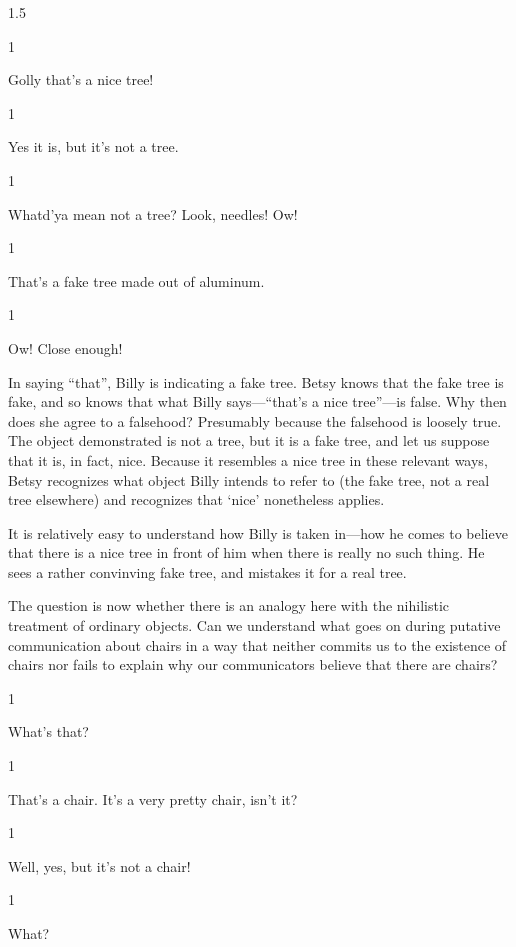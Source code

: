\documentclass[11pt]{standalone} \newif\ifstandlone \standalonetrue
\newcommand{\stage}[3]%
{%
	\begin{spacing}{1}%
	\vspace{0pt}
		\begin{description}[style=nextline, parsep=0pt,
                    leftmargin=15mm, itemindent=-10mm, font=\mdseries]
			\item[\textsc{#1} \emph{#2}] #3
		\end{description}%
	\end{spacing}%
}
\begin{document}
\begin{spacing}{1.5}
\stage{Billy}{(pointing)}{Golly that's a nice tree!}

\stage{Betsy}{}{Yes it is, but it's not a tree.}

\stage{Billy}{}{Whatd'ya mean not a tree?  Look, needles!  Ow!}

\stage{Betsy}{}{That's a fake tree made out of aluminum.}

\stage{Billy}{}{Ow!  Close enough!}

In saying ``that'', Billy is indicating a fake tree.  Betsy knows that
the fake tree is fake, and so knows that what Billy says---``that's a
nice tree''---is false.  Why then does she agree to a falsehood?
Presumably because the falsehood is loosely true.  The object
demonstrated is not a tree, but it is a fake tree, and let us suppose
that it is, in fact, nice.  Because it resembles a nice tree in these
relevant ways, Betsy recognizes what object Billy intends to refer to
(the fake tree, not a real tree elsewhere) and recognizes that
`nice' nonetheless applies.

It is relatively easy to understand how Billy is taken in---how he
comes to believe that there is a nice tree in front of him when there
is really no such thing.  He sees a rather convinving fake tree, and
mistakes it for a real tree.

The question is now whether there is an analogy here with the
nihilistic treatment of ordinary objects.  Can we understand what goes
on during putative communication about chairs in a way that neither
commits us to the existence of chairs nor fails to explain why our
communicators believe that there are chairs?

\stage{Child}{}{What's that?}

\stage{Parent}{}{That's a chair.  It's a very pretty chair, isn't it?}

\stage{Peter Unger}{(runs in)}{Well, yes, but it's not a chair!}

\stage{Parent}{}{What?}


\end{spacing}
\end{document}
